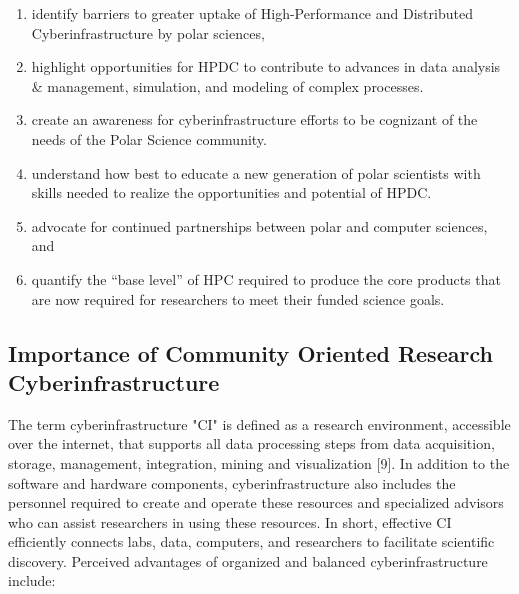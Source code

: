 \documentclass[10pt,letterpaper,draft]{article}
\begin{document}
 
\begin{enumerate}[label=\roman*., itemsep=0pt, topsep=0pt]

\item identify barriers to greater uptake of High-Performance and Distributed Cyberinfrastructure by polar sciences,

\item highlight opportunities for HPDC to contribute to advances in data analysis & management, simulation, and modeling of complex processes.

\item create an awareness for cyberinfrastructure efforts to be cognizant of the needs of the Polar Science community.

\item understand how best to educate a new generation of polar scientists with skills needed to realize the opportunities and potential of HPDC.

\item advocate for continued partnerships between polar and computer sciences, and

\item quantify the “base level” of HPC required to produce the core products that are now required for researchers to meet their funded science goals.

\end{enumerate}

\subsection*{Importance of Community Oriented Research Cyberinfrastructure}

The term cyberinfrastructure "CI" is defined as a research environment, accessible over the internet, that supports all data processing steps from data acquisition, storage, management, integration, mining and visualization [9]. In addition to the software and hardware components, cyberinfrastructure also includes the personnel required to create and operate these resources and specialized advisors who can assist researchers in using these resources. In short, effective CI efficiently connects labs, data, computers, and researchers to facilitate scientific discovery. Perceived advantages of organized and balanced cyberinfrastructure include:
\end{document}
